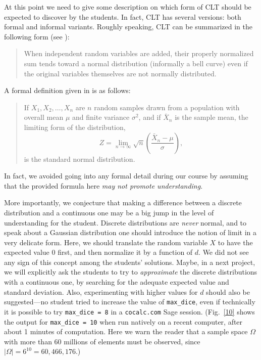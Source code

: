 \documentclass[]{interact}
\theoremstyle{plain}%
\theoremstyle{definition}
\theoremstyle{remark}
\begin{document}
At this point we need to give some description on which form of CLT should be expected to discover by the students.
In fact, CLT has several versions: both formal and informal variants. Roughly speaking, CLT can be summarized
in the following form (see \cite{Wikipedia-CLT}):
\begin{quote}
When independent random variables are added, their properly normalized
sum tends toward a normal distribution (informally a bell curve) even if
the original variables themselves are not normally distributed.
\end{quote}
A formal definition given in \cite[p.~241]{Montgomery2014} is as follows:
\begin{quote}
If $X_{1},X_{2},\ldots,X_{n}$
are $n$ random samples drawn from a population
with overall mean $\mu$ and finite variance $\sigma^2$,
and if ${\bar {X}}_{n}$ is the sample mean, the
limiting form of the distribution, $$Z=\lim _{n\to \infty}{\sqrt {n}}{\left({\frac {{\bar {X}}_{n}-\mu }
{\sigma}}\right)},$$ is the standard normal
distribution.
\end{quote}
In fact, we avoided going into any formal detail during our course by assuming that the provided formula
here \textit{may not promote understanding}.

More importantly, we conjecture that making a difference between a discrete distribution and a continuous one may be
a big jump in the level of understanding for the student. Discrete distributions are \textit{never} normal,
and to speak about a Gaussian distribution one should introduce the notion of limit in a very
delicate form. Here, we should translate the random variable $X$ to have the expected value $0$ first,
and then normalize it by a function of $d$. We did not see any sign of this concept among the
students' solutions. Maybe, in a next project, we will explicitly ask the students to try to
\textit{approximate} the discrete distributions with a continuous one, by searching for the adequate
expected value and standard deviation. Also, experimenting with higher values for $d$ should also be
suggested---no student
tried to increase the value of \texttt{max\_dice}, even if technically it is possible to try
\texttt{max\_dice = 8} in a \texttt{cocalc.com} Sage session. (Fig.~\ref{10} shows the output
for \texttt{max\_dice = 10} when run natively on a recent computer, after about 1 minutes
of computation. Here we warn the reader that a sample space $\Omega$ with more than 60 millions of elements
must be observed, since $|\Omega|=6^{10}=60,466,176$.)
\end{document}
